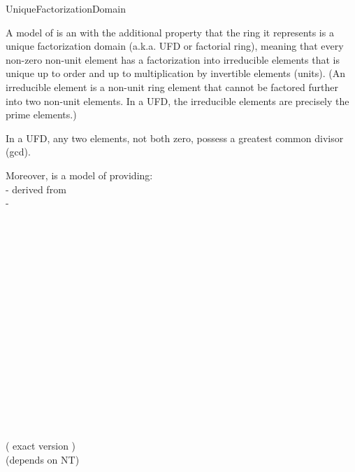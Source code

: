 \begin{ccRefConcept}{UniqueFactorizationDomain}


\ccDefinition


A model of  is an  with the additional property 
that the ring it represents is a unique factorization domain 
(a.k.a. UFD or factorial ring), meaning that every non-zero non-unit 
element has a factorization into irreducible elements that is unique 
up to order and up to multiplication by invertible elements (units). 
(An irreducible element is a non-unit ring element that cannot be factored 
further into two non-unit elements. In a UFD, the irreducible elements 
are precisely the prime elements.)

In a UFD, any two elements, not both zero, possess a greatest common 
divisor (gcd). 

Moreover,  is a model of 
 providing:\\
 
-  
derived from  \\
- \\
  

 
\ccRefines
 
\ccSeeAlso

\\
\\
\\
\\
\\
\\
\\
\\
\\

\ccHasModels
{}\\
\\

 \\
 \\

 \\

 \\

 \\

 ( exact version )\\
 (depends on NT) \\



\end{ccRefConcept}